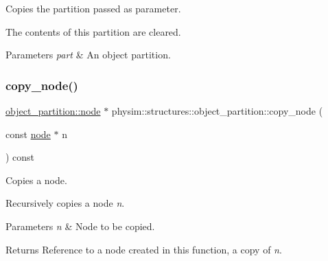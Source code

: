 Copies the partition passed as parameter. 

The contents of this partition are cleared. 
\begin{DoxyParams}{Parameters}
{\em part} & An object partition. \\
\hline
\end{DoxyParams}
\mbox{\label{classphysim_1_1structures_1_1object__partition_a3ffb4d83ee3be148c31a85e0603d7be7}} 
\subsubsection{\texorpdfstring{copy\+\_\+node()}{copy\_node()}}
{\footnotesize\ttfamily \hyperlink{structphysim_1_1structures_1_1object__partition_1_1node}{object\+\_\+partition\+::node} $\ast$ physim\+::structures\+::object\+\_\+partition\+::copy\+\_\+node (\begin{DoxyParamCaption}\item[{const \hyperlink{structphysim_1_1structures_1_1object__partition_1_1node}{node} $\ast$}]{n }\end{DoxyParamCaption}) const\hspace{0.3cm}{\ttfamily [private]}}



Copies a node. 

Recursively copies a node {\itshape n}. 
\begin{DoxyParams}{Parameters}
{\em n} & Node to be copied. \\
\hline
\end{DoxyParams}
\begin{DoxyReturn}{Returns}
Reference to a node created in this function, a copy of {\itshape n}. 
\end{DoxyReturn}
\mbox{\label{classphysim_1_1structures_1_1object__partition_a9842318da10d96079d00fe53debd9398}} 
